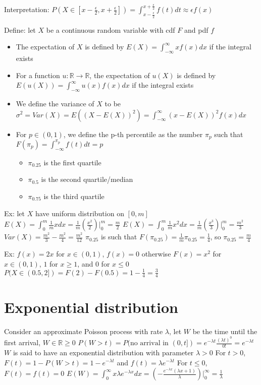 \documentclass{article}
\begin{document}
Interpretation: $P(X\in[x-\frac{\epsilon}{2},x+\frac{\epsilon}{2}])=\int_{x-\frac{\epsilon}{2}}^{x+\frac{\epsilon}{2}}f(t)dt\approx\epsilon f(x)$

Define: let $X$ be a continuous random variable with cdf $F$ and pdf $f$
\begin{itemize}
    \item The expectation of $X$ is defined by $E(X)=\int_{-\infty}^\infty xf(x)dx$ if the integral exists
    \item For a function $u:\mathbb{R}\to\mathbb{R}$, the expectation of $u(X)$ is defined by $E(u(X))=\int_{-\infty}^\infty u(x)f(x)dx$ if the integral exists
\item We define the variance of $X$ to be $\sigma^2=Var(X)=E((X-E(X))^2)=\int_{-\infty}^\infty(x-E(X))^2f(x)dx$
\item For $p\in(0,1)$, we define the p-th percentile as the number $\pi_p$ such that $F(\pi_p)=\int_{-\infty}^{\pi_p}f(t)dt=p$
\begin{itemize}
    \item $\pi_{0.25}$ is the first quartile
    \item $\pi_{0.5}$ is the second quartile/median
    \item $\pi_{0.75}$ is the third quartile
\end{itemize}
\end{itemize}

Ex: let $X$ have uniform distribution on $[0,m]$
$E(X)=\int_0^m\frac{1}{m}xdx=\frac{1}{m}(\frac{x^2}{2})\vert_0^m=\frac{m}{2}$
$E(X)=\int_0^m\frac{1}{m}x^2dx=\frac{1}{m}(\frac{x^3}{3})\vert_0^m=\frac{m^2}{3}$
$Var(X)=\frac{m^2}{3}-\frac{m^2}{4}=\frac{m^2}{12}$
$\pi_{0.25}$ is such that $F(\pi_{0.25})=\frac{1}{m}\pi_{0.25}=\frac{1}{4}$, so $\pi_{0.25}=\frac{m}{4}$

Ex: $f(x)=2x$ for $x\in(0,1)$, $f(x)=0$ otherwise
$F(x)=x^2$ for $x\in(0,1)$, $1$ for $x\ge1$, and $0$ for $x\le0$
$P(X\in(0.5,2])=F(2)-F(0.5)=1-\frac{1}{4}=\frac{3}{4}$

\section{Exponential distribution}

Consider an approximate Poisson process with rate $\lambda$, let $W$ be the time until the first arrival, $W\in\mathbb{R}\ge0$
$P(W>t)=P(\text{no arrival in }(0,t])=e^{-\lambda t}\frac{(\lambda t)^0}{0!}=e^{-\lambda t}$
$W$ is said to have an exponential distribution with parameter $\lambda>0$
For $t>0$, $F(t)=1-P(W>t)=1-e^{-\lambda t}$ and $f(t)=\lambda e^{-\lambda t}$
For $t\le0$, $F(t)=f(t)=0$
$E(W)=\int_0^\infty x\lambda e^{-\lambda x}dx=(-\frac{e^{-\lambda x}(\lambda x+1)}{\lambda})\vert_0^\infty=\frac{1}{\lambda}$
\end{document}
